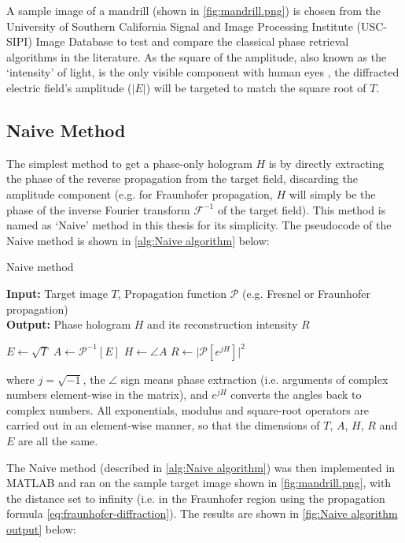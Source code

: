 A sample image of a mandrill (shown in \cref{fig:mandrill.png}) is chosen from the University of Southern California Signal and Image Processing Institute (USC-SIPI) Image Database \cite{MANDRILL_REF} to test and compare the classical phase retrieval algorithms in the literature. As the square of the amplitude, also known as the `intensity' of light, is the only visible component with human eyes \cite{Huang2024}, the diffracted electric field's amplitude ($\vert E \vert$) will be targeted to match the square root of $T$.


\subsection{Naive Method}\label{sec:Naive algorithm}
The simplest method to get a phase-only hologram $H$ is by directly extracting the phase of the reverse propagation from the target field, discarding the amplitude component (e.g. for Fraunhofer propagation, $H$ will simply be the phase of the inverse Fourier transform $\mathcal{F} ^{-1}$ of the target field). This method is named as `Naive' method in this thesis for its simplicity. The pseudocode of the Naive method is shown in \cref{alg:Naive algorithm} below:
\begin{algorithm}[H]
  \caption{Naive method}\label{alg:Naive algorithm}
  \textbf{Input:} Target image $T$, Propagation function $\mathcal{P}$ (e.g. Fresnel or Fraunhofer propagation)\\
  \textbf{Output:} Phase hologram $H$ and its reconstruction intensity $R$
  \begin{algorithmic}
    \State $E \gets \sqrt{T}$
    \State $A \gets \mathcal{P}^{-1}[E]$
    \State $H \gets \angle A$
    \State $R \gets \vert \mathcal{P}[e^{jH}] \vert ^2 $
  \end{algorithmic}
\end{algorithm}
where $j = \sqrt{-1} $, the $\angle$ sign means phase extraction (i.e. arguments of complex numbers element-wise in the matrix), and $e^{jH}$ converts the angles back to complex numbers. All exponentials, modulus and square-root operators are carried out in an element-wise manner, so that the dimensions of $T$, $A$, $H$, $R$ and $E$ are all the same.

The Naive method (described in \cref{alg:Naive algorithm}) was then implemented in MATLAB and ran on the sample target image shown in \cref{fig:mandrill.png}, with the distance set to infinity (i.e. in the Fraunhofer region using the propagation formula \cref{eq:fraunhofer-diffraction}). The results are shown in \cref{fig:Naive algorithm output} below:


